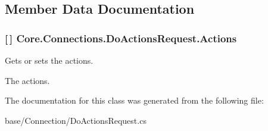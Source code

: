 \subsection{Member Data Documentation}
\hypertarget{classCore_1_1Connections_1_1DoActionsRequest_a25fbe4ad38c5390024d7cb616507957c}{}
\subsubsection[{Actions}]{ \mbox{[}$\,$\mbox{]} Core.\+Connections.\+Do\+Actions\+Request.\+Actions}\label{classCore_1_1Connections_1_1DoActionsRequest_a25fbe4ad38c5390024d7cb616507957c}


Gets or sets the actions. 

The actions.

The documentation for this class was generated from the following file\+:\begin{DoxyCompactItemize}
\item 
base/\+Connection/Do\+Actions\+Request.\+cs\end{DoxyCompactItemize}
